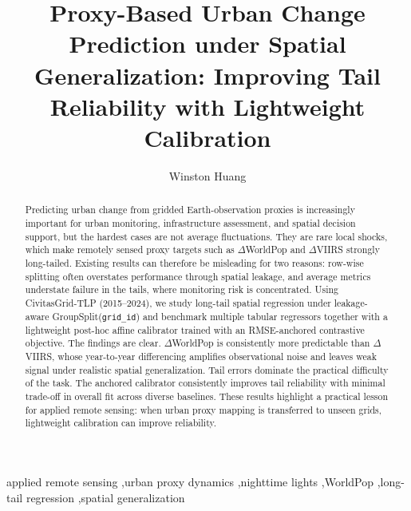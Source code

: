\documentclass[preprint,12pt]{elsarticle}
\begin{document}
\begin{frontmatter}

\title{Proxy-Based Urban Change Prediction under Spatial Generalization: Improving Tail Reliability with Lightweight Calibration}

\author[1]{Winston Huang}



\begin{abstract}
Predicting urban change from gridded Earth-observation proxies is increasingly important for urban monitoring, infrastructure assessment, and spatial decision support, but the hardest cases are not average fluctuations. They are rare local shocks, which make remotely sensed proxy targets such as $\Delta$WorldPop and $\Delta$VIIRS strongly long-tailed. Existing results can therefore be misleading for two reasons: row-wise splitting often overstates performance through spatial leakage, and average metrics understate failure in the tails, where monitoring risk is concentrated. Using CivitasGrid-TLP (2015--2024), we study long-tail spatial regression under leakage-aware GroupSplit(\texttt{grid\_id}) and benchmark multiple tabular regressors together with a lightweight post-hoc affine calibrator trained with an RMSE-anchored contrastive objective. The findings are clear. $\Delta$WorldPop is consistently more predictable than $\Delta$VIIRS, whose year-to-year differencing amplifies observational noise and leaves weak signal under realistic spatial generalization. Tail errors dominate the practical difficulty of the task. The anchored calibrator consistently improves tail reliability with minimal trade-off in overall fit across diverse baselines. These results highlight a practical lesson for applied remote sensing: when urban proxy mapping is transferred to unseen grids, lightweight calibration can improve reliability.
\end{abstract}

\begin{keyword}
applied remote sensing \sep urban proxy dynamics \sep nighttime lights \sep WorldPop \sep long-tail regression \sep spatial generalization
\end{keyword}

\end{frontmatter}
\end{document}
